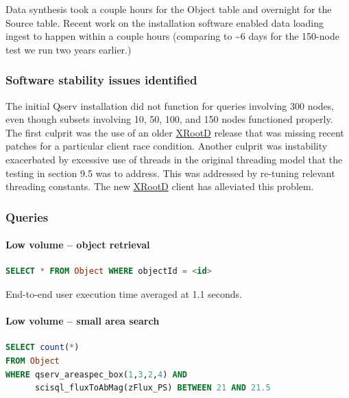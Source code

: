 \documentclass[DM,lsstdraft,toc]{lsstdoc}
\begin{document}
Data synthesis took a couple hours for the Object table and overnight
for the Source table. Recent work on the installation software enabled
data loading ingest to happen within a couple hours (comparing to
\textasciitilde{}6 days for the 150-node test we run two years earlier.)

\subsubsection{Software stability issues
identified}\label{software-stability-issues-identified}

The initial Qserv installation did not function for queries involving
300 nodes, even though subsets involving 10, 50, 100, and 150 nodes
functioned properly. The first culprit was the use of an older
\href{http://xrootd.org}{XRootD} release that was missing recent patches
for a particular client race condition. Another culprit was instability
exacerbated by excessive use of threads in the original threading model
that the testing in section 9.5 was to address. This was addressed by
re-tuning relevant threading constants. The new
\href{http://xrootd.org}{XRootD} client has alleviated this problem.

\subsubsection{Queries}\label{queries-1}

\paragraph{Low volume -- object
retrieval}\label{low-volume-object-retrieval}

\begin{lstlisting}[language=SQL]
SELECT * FROM Object WHERE objectId = <id>
\end{lstlisting}

End-to-end user execution time averaged at 1.1 seconds.

\paragraph{Low volume -- small area
search}\label{low-volume-small-area-search}

\begin{lstlisting}[language=SQL]
SELECT count(*)
FROM Object
WHERE qserv_areaspec_box(1,3,2,4) AND
      scisql_fluxToAbMag(zFlux_PS) BETWEEN 21 AND 21.5
\end{lstlisting}
\end{document}

